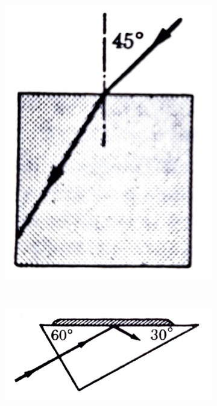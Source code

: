 \documentclass[addpoints]{exam}
\begin{document}
\begin{questions}
    \begin{figure}
        \centering
        \begin{subfigure}{0.45\textwidth}
            \centering
            \includegraphics[scale=0.15]{reflexiontotal.pdf}
            \caption{ }
            \label{fig:reflexiontotal}
        \end{subfigure}
        ~
        \begin{subfigure}{0.45\textwidth}
            \centering
            \includegraphics[scale=0.3]{refraccion.pdf}
            \caption{}
            \label{fig:refraccion}
        \end{subfigure}
        \caption{ }
    \end{figure}


\end{questions}
\end{document}
